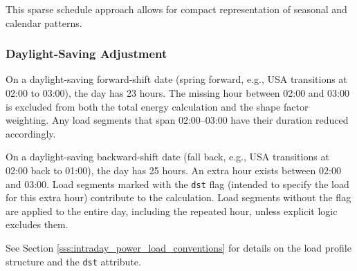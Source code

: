 This sparse schedule approach allows for compact representation of seasonal and calendar patterns.

\subsubsection{Daylight-Saving Adjustment}

On a daylight-saving forward-shift date (spring forward, e.g., USA transitions at 02:00 to 03:00), the day has 23 hours. The missing hour between 02:00 and 03:00 is excluded from both the total energy calculation and the shape factor weighting. Any load segments that span 02:00--03:00 have their duration reduced accordingly.

On a daylight-saving backward-shift date (fall back, e.g., USA transitions at 02:00 back to 01:00), the day has 25 hours. An extra hour exists between 02:00 and 03:00. Load segments marked with the \lstinline!dst! flag (intended to specify the load for this extra hour) contribute to the calculation. Load segments without the flag are applied to the entire day, including the repeated hour, unless explicit logic excludes them.

See Section \ref{sss:intraday_power_load_conventions} for details on the load profile structure and the \lstinline!dst! attribute.
